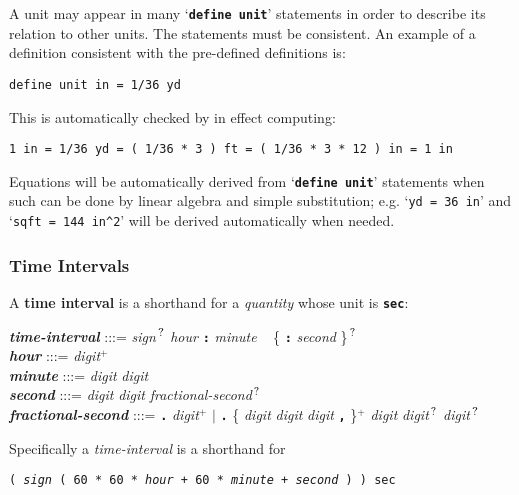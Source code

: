 \documentclass[12pt]{article}
\newcommand{\TT}[1]{{\tt \bfseries #1}}
\newcommand{\key}[1]{{\rm \bfseries #1}}
\newcommand{\emkey}[1]{{\em \bfseries #1}}
\newcommand{\PLUS}[1][]{{$^{+#1}$}}
\newcommand{\QMARK}{{$^{\,\mbox{\footnotesize ?}}$}}
\newcommand{\CIRCUM}{\textasciicircum}
\newenvironment{indpar}[1][0.3in]%
	{\begin{list}{}%
		     {\setlength{\itemsep}{0in}%
		      \setlength{\topsep}{0in}%
		      \setlength{\parsep}{1ex}%
		      \setlength{\labelwidth}{#1}%
		      \setlength{\leftmargin}{#1}%
		      \addtolength{\leftmargin}{\labelsep}}%
	 \item}%
	{\end{list}}
\begin{document}
A unit may appear in many `\TT{define unit}' statements in order to describe
its relation to other units.  The statements must be consistent.
An example of a definition consistent with the pre-defined
definitions is:

\begin{indpar}\begin{verbatim}
define unit in = 1/36 yd
\end{verbatim}\end{indpar}

This is automatically checked by in effect computing:
\begin{center}
\tt 1 in = 1/36 yd = ( 1/36 * 3 ) ft = ( 1/36 * 3 * 12 ) in
= 1 in
\end{center}

Equations will be automatically derived from `\TT{define unit}' statements
when such can be done by linear algebra and simple substitution; e.g.
`{\tt yd = 36 in}' and `{\tt sqft = 144 in\CIRCUM 2}'
will be derived automatically when needed.



\subsubsection{Time Intervals}
\label{TIME-INTERVALS}

A \key{time interval} is a shorthand for a {\em quantity} whose
unit is \TT{sec}:

\begin{indpar}
\emkey{time-interval} :::= {\em sign}\QMARK{} {\em hour} \TT{:} {\em minute} ~
                          \{ \TT{:} {\em second} \}\QMARK{}
\label{TIME-INTERVAL}
\\[1ex]
\emkey{hour} :::= {\em digit}\PLUS{}
\\[1ex]
\emkey{minute} :::= {\em digit} {\em digit}
\\[1ex]
\emkey{second} :::=
	{\em digit} {\em digit} {\em fractional-second}\QMARK{}
\\[1ex]
\emkey{fractional-second} :::= \TT{.} {\em digit}\PLUS{}
	$|$ \TT{.} \{ {\em digit} {\em digit} {\em digit} \TT{,} \}\PLUS{}
	    {\em digit} {\em digit}\QMARK{} {\em digit}\QMARK{}
\end{indpar}

Specifically a {\em time-interval} is a shorthand for
\begin{center}
\tt ( {\em sign} ( 60 * 60 * {\em hour} + 60 * {\em minute} + {\em second} ) ) sec
\end{center}
\end{document}
